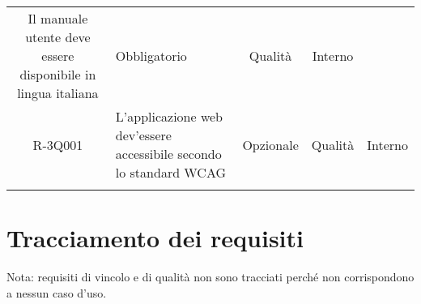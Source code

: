 \begin{tabularx}{\textwidth}{cXccc}
	Il manuale utente deve essere disponibile in lingua italiana   &
	
	Obbligatorio &
	
	Qualità &
	
	Interno \\
		
	R-3Q001 &
	
	L'applicazione web dev'essere accessibile secondo lo standard WCAG   &
	
	Opzionale &
	
	Qualità &
	
	Interno \\
	\rowcolor{white}
	 \caption{Tabella requisiti di qualità} \label{tab:tabellarequisitiqualità}
\end{tabularx}


\section{Tracciamento dei requisiti}
Nota: requisiti di vincolo e di qualità non sono tracciati perché non corrispondono a nessun caso d'uso.
